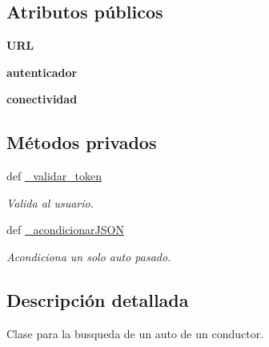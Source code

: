 \subsection*{Atributos públicos}
\begin{DoxyCompactItemize}
\item 
\hypertarget{classsrc_1_1resources_1_1auto_por_i_d_1_1_auto_por_i_d_ab83ee5e25d5d5ff743a29db5d1576fb3}{{\bfseries U\-R\-L}}\label{classsrc_1_1resources_1_1auto_por_i_d_1_1_auto_por_i_d_ab83ee5e25d5d5ff743a29db5d1576fb3}

\item 
\hypertarget{classsrc_1_1resources_1_1auto_por_i_d_1_1_auto_por_i_d_a0c36cdf16a521489f5145f46abe15dd2}{{\bfseries autenticador}}\label{classsrc_1_1resources_1_1auto_por_i_d_1_1_auto_por_i_d_a0c36cdf16a521489f5145f46abe15dd2}

\item 
\hypertarget{classsrc_1_1resources_1_1auto_por_i_d_1_1_auto_por_i_d_a565b94d7efb9397613492af18f245e9a}{{\bfseries conectividad}}\label{classsrc_1_1resources_1_1auto_por_i_d_1_1_auto_por_i_d_a565b94d7efb9397613492af18f245e9a}

\end{DoxyCompactItemize}
\subsection*{Métodos privados}
\begin{DoxyCompactItemize}
\item 
def \hyperlink{classsrc_1_1resources_1_1auto_por_i_d_1_1_auto_por_i_d_a227dddfb3e2156a084f85a23b2ddcf6d}{\-\_\-validar\-\_\-token}
\begin{DoxyCompactList}\small\item\em Valida al usuario. \end{DoxyCompactList}\item 
def \hyperlink{classsrc_1_1resources_1_1auto_por_i_d_1_1_auto_por_i_d_a22de3a2bd3a5024a6875e5683ddb491c}{\-\_\-acondicionar\-J\-S\-O\-N}
\begin{DoxyCompactList}\small\item\em Acondiciona un solo auto pasado. \end{DoxyCompactList}\end{DoxyCompactItemize}


\subsection{Descripción detallada}
Clase para la busqueda de un auto de un conductor. 



